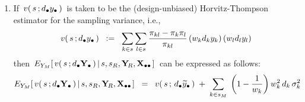 \begin{lemma}
\begin{enumerate}
\begin{equation*}
                \Ydot,
                \Xobs
                \,\right)
            \,\right]
    \end{equation*}
\item
    If
    \,$v(\,s\,;d_{\bullet}y_{\bullet}\,)$\,
    is taken to be the (design-unbiased) Horvitz-Thompson estimator for the sampling variance, i.e.,
    \begin{equation*}
    v(\,s\,;d_{\bullet}y_{\bullet}\,)
    \;\; := \;\;
        \underset{k \in s}{\sum}\,
        \underset{l \in s}{\sum}\,
        \dfrac{\pi_{kl} - \pi_{k}\pi_{l}}{\pi_{kl}}\,
        (w_{k}d_{k}y_{k})\,(w_{l}d_{l}y_{l})
    \end{equation*}
    then
    \,$
    E_{Y_{M}}\!\left[\,
        v(\,s\,;d_{\bullet}\mathbf{Y}_{\bullet}\,)
        \left\vert\,
        s,s_{R},\mathbf{Y}_{\!R},\mathbf{X}_{\bullet\bullet}
        \right.
        \right]
    $\,
    can be expressed as follows:
    \begin{equation*}
    E_{Y_{M}}\!\left[\,
        v(\,s\,;d_{\bullet}\mathbf{Y}_{\bullet}\,)
        \left\vert\,
        s,s_{R},\mathbf{Y}_{\!R},\mathbf{X}_{\bullet\bullet}
        \right.
        \right]
    \;\; = \;\;
        v(\,s\,;\,d_{\bullet}\widetilde{y}_{\bullet}\,)
        \;+\;
        \underset{k \in s_{M}}{\sum}\;
        \left(1-\dfrac{1}{w_{k}}\right)w_{k}^{2}\,d_{k}\,\sigma_{k}^{2}
    \end{equation*}
\end{enumerate}
\end{lemma}
\proof
\renewcommand{\theenumi}{\roman{enumi}}
\renewcommand{\labelenumi}{\mbox{}\;\;\,(\theenumi)$\quad$}

